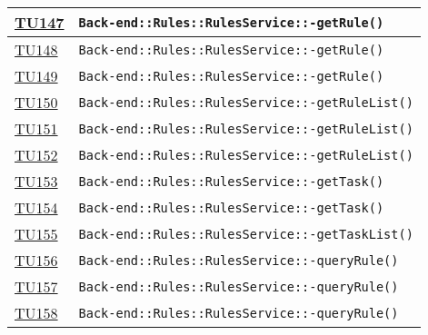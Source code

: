 \begin{longtable}{|>{\centering}m{1cm}|m{12cm}<{\centering}|}
\hyperlink{TU147}{TU147} & \texttt{Back-end::Rules::RulesService::-\linebreak getRule()}\\ \hline

\hyperlink{TU148}{TU148} & \texttt{Back-end::Rules::RulesService::-\linebreak getRule()}\\ \hline

\hyperlink{TU149}{TU149} & \texttt{Back-end::Rules::RulesService::-\linebreak getRule()}\\ \hline

\hyperlink{TU150}{TU150} & \texttt{Back-end::Rules::RulesService::-\linebreak getRuleList()}\\ \hline

\hyperlink{TU151}{TU151} & \texttt{Back-end::Rules::RulesService::-\linebreak getRuleList()}\\ \hline

\hyperlink{TU152}{TU152} & \texttt{Back-end::Rules::RulesService::-\linebreak getRuleList()}\\ \hline

\hyperlink{TU153}{TU153} & \texttt{Back-end::Rules::RulesService::-\linebreak getTask()}\\ \hline

\hyperlink{TU154}{TU154} & \texttt{Back-end::Rules::RulesService::-\linebreak getTask()}\\ \hline

\hyperlink{TU155}{TU155} & \texttt{Back-end::Rules::RulesService::-\linebreak getTaskList()}\\ \hline

\hyperlink{TU156}{TU156} & \texttt{Back-end::Rules::RulesService::-\linebreak queryRule()}\\ \hline

\hyperlink{TU157}{TU157} & \texttt{Back-end::Rules::RulesService::-\linebreak queryRule()}\\ \hline

\hyperlink{TU158}{TU158} & \texttt{Back-end::Rules::RulesService::-\linebreak queryRule()}\\ \hline


\end{longtable}
